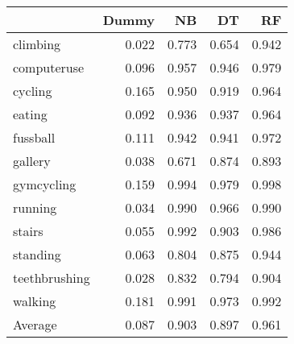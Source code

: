 \begin{tabular}{lrrrr}
\toprule
{} &  Dummy &    NB &    DT &    RF \\
\midrule
climbing      &  0.022 & 0.773 & 0.654 & 0.942 \\
computeruse   &  0.096 & 0.957 & 0.946 & 0.979 \\
cycling       &  0.165 & 0.950 & 0.919 & 0.964 \\
eating        &  0.092 & 0.936 & 0.937 & 0.964 \\
fussball      &  0.111 & 0.942 & 0.941 & 0.972 \\
gallery       &  0.038 & 0.671 & 0.874 & 0.893 \\
gymcycling    &  0.159 & 0.994 & 0.979 & 0.998 \\
running       &  0.034 & 0.990 & 0.966 & 0.990 \\
stairs        &  0.055 & 0.992 & 0.903 & 0.986 \\
standing      &  0.063 & 0.804 & 0.875 & 0.944 \\
teethbrushing &  0.028 & 0.832 & 0.794 & 0.904 \\
walking       &  0.181 & 0.991 & 0.973 & 0.992 \\
Average       &  0.087 & 0.903 & 0.897 & 0.961 \\
\bottomrule
\end{tabular}
